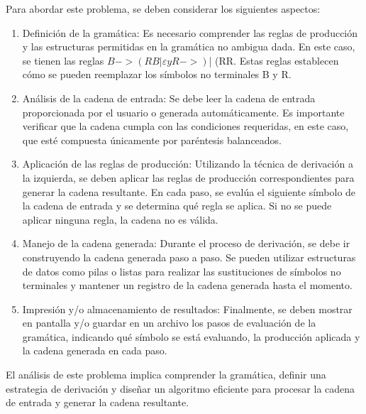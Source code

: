 Para abordar este problema, se deben considerar los siguientes aspectos:\newline
\begin{enumerate}
    \item Definición de la gramática: Es necesario comprender las reglas de producción y las estructuras permitidas en la gramática no ambigua dada. En este caso, se tienen las reglas $B -> (RB | ε y R -> ) $| (RR. Estas reglas establecen cómo se pueden reemplazar los símbolos no terminales B y R.\newline

    \item Análisis de la cadena de entrada: Se debe leer la cadena de entrada proporcionada por el usuario o generada automáticamente. Es importante verificar que la cadena cumpla con las condiciones requeridas, en este caso, que esté compuesta únicamente por paréntesis balanceados.\newline
    
    \item Aplicación de las reglas de producción: Utilizando la técnica de derivación a la izquierda, se deben aplicar las reglas de producción correspondientes para generar la cadena resultante. En cada paso, se evalúa el siguiente símbolo de la cadena de entrada y se determina qué regla se aplica. Si no se puede aplicar ninguna regla, la cadena no es válida.\newline
    
    \item Manejo de la cadena generada: Durante el proceso de derivación, se debe ir construyendo la cadena generada paso a paso. Se pueden utilizar estructuras de datos como pilas o listas para realizar las sustituciones de símbolos no terminales y mantener un registro de la cadena generada hasta el momento.\newline
    
    \item Impresión y/o almacenamiento de resultados: Finalmente, se deben mostrar en pantalla y/o guardar en un archivo los pasos de evaluación de la gramática, indicando qué símbolo se está evaluando, la producción aplicada y la cadena generada en cada paso.\newline
\end{enumerate}


El análisis de este problema implica comprender la gramática, definir una estrategia de derivación y diseñar un algoritmo eficiente para procesar la cadena de entrada y generar la cadena resultante.\newline


